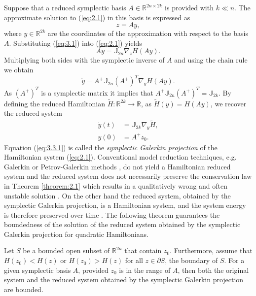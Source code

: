 Suppose that a reduced symplectic basis $A \in \mathbb R^{2n\times 2k}$ is provided with $k \ll n$. The approximate solution to (\ref{eq:2.1}) in this basis is expressed as
\begin{equation} \label{eq:3.1}
	z =Ay,
\end{equation}
where $y\in \mathbb R^{2k}$ are the coordinates of the approximation with respect to the basis $A$. Substituting (\ref{eq:3.1}) into (\ref{eq:2.1}) yields
\begin{equation} \label{eq:3.2}
	A \dot y = \mathbb{J}_{2n} \nabla_{z} H(A y).
\end{equation}
Multiplying both sides with the symplectic inverse of $A$ and using the chain rule we obtain
\begin{equation} \label{eq:3.3}
	\dot y = A^+ \mathbb{J}_{2n} (A^+)^T \nabla_{y} H(A y).
\end{equation}
As $(A^+)^T$ is a symplectic matrix it implies that $A^+ \mathbb{J}_{2n} (A^+)^T = \mathbb{J}_{2k}$. By defining the reduced Hamiltonian $\tilde H : \mathbb{R}^{2k} \to \mathbb R$, as $\tilde H (y) = H(Ay)$, we recover the reduced system
\begin{equation} \label{eq:3.3.1}
	\begin{aligned}
	\dot {y}(t) &= \mathbb J_{2k} \nabla_{y} \tilde H, \\
	y(0) &= A^+ z_0.
	\end{aligned}
\end{equation}
Equation (\ref{eq:3.3.1}) is called the \emph{symplectic Galerkin projection} \cite{Peng:2014di} of the Hamiltonian system (\ref{eq:2.1}). Conventional model reduction techniques, e.g. Galerkin or Petrov-Galerkin methods \cite{hesthaven2015certified,quarteroni2015reduced}, do not yield a Hamiltonian reduced system and the reduced system does not necessarily preserve the conservation law in Theorem \ref{theorem:2.1} which results in a qualitatively wrong and often unstable solution \cite{Peng:2014di}. On the other hand the reduced system, obtained by the symplectic Galerkin projection, is a Hamiltonian system, and the system energy is therefore preserved over time \cite{Peng:2014di}. The following theorem guarantees the boundedness of the solution of the reduced system obtained by the symplectic Galerkin projection for quadratic Hamiltonians.

\begin{theorem}
\cite{Peng:2014di} Let $S$ be a bounded open subset of $\mathbb R^{2n}$ that contain $z_0$. Furthermore, assume that $H(z_0)<H(z)$ or $H(z_0)>H(z)$ for all $z\in \partial S$, the boundary of $S$. For a given symplectic basis $A$, provided $z_0$ is in the range of $A$, then both the original system and the reduced system obtained by the symplectic Galerkin projection are bounded.
\end{theorem}

